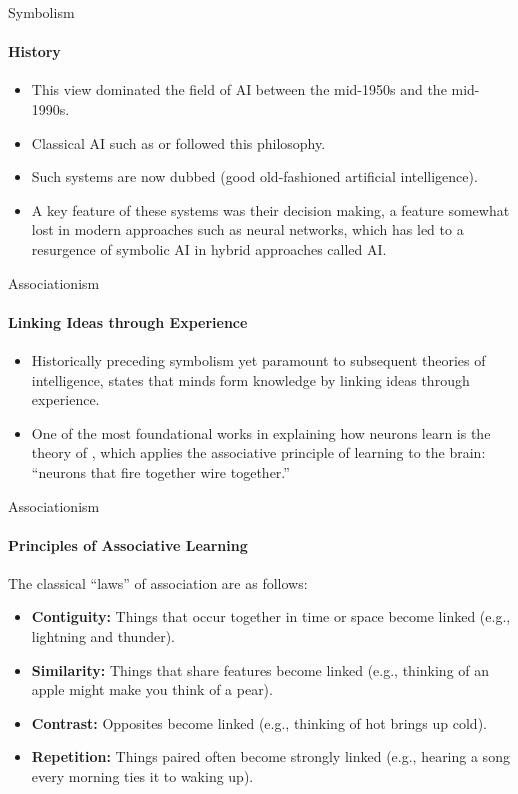 \begin{frame}{Symbolism}
    \framesubtitle{History}
    \begin{itemize}
        \item This view dominated the field of AI between the mid-1950s and the mid-1990s.
        \item Classical AI such as  or  followed this philosophy.
        \item Such systems are now dubbed  (good old-fashioned artificial intelligence).
        \item A key feature of these systems was their  decision making, a feature somewhat lost in modern approaches such as neural networks,
              which has led to a resurgence of symbolic AI in hybrid approaches called  AI.
    \end{itemize}
\end{frame}

\begin{frame}{Associationism}
    \framesubtitle{Linking Ideas through Experience}
    \begin{itemize}
        \item Historically preceding symbolism yet paramount to subsequent theories of intelligence,  states that minds form knowledge by linking ideas through experience.
        \item One of the most foundational works in explaining how neurons learn is the theory of , which applies the associative principle of learning to the brain:
              ``neurons that fire together wire together.''
    \end{itemize}
\end{frame}

\begin{frame}{Associationism}
    \framesubtitle{Principles of Associative Learning}
    The classical ``laws'' of association are as follows:
    \begin{itemize}
        \item \textbf{Contiguity:} Things that occur together in time or space become linked (e.g., lightning and thunder).
        \item \textbf{Similarity:} Things that share features become linked (e.g., thinking of an apple might make you think of a pear).
        \item \textbf{Contrast:} Opposites become linked (e.g., thinking of hot brings up cold).
        \item \textbf{Repetition:} Things paired often become strongly linked (e.g., hearing a song every morning ties it to waking up).
    \end{itemize}
\end{frame}

